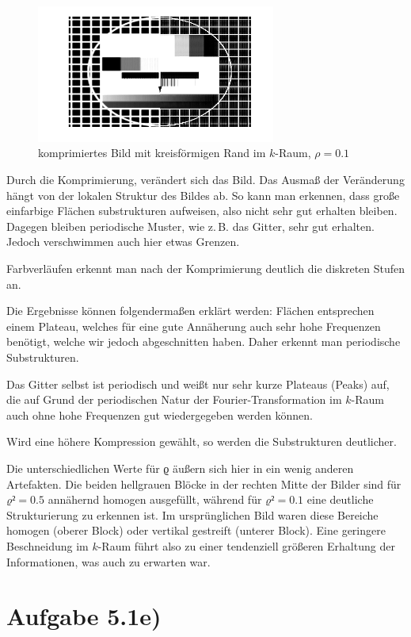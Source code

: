 \begin{figure}[htb]
\centering
  \includegraphics[width=0.7\textwidth,keepaspectratio]{../tmp/eins_c_0_1}
  \caption{komprimiertes Bild mit kreisförmigen Rand im $k$-Raum, $ρ=0.1$}
  \label{fig:1d1}
\end{figure}

Durch die Komprimierung, verändert sich das Bild. Das Ausmaß der Veränderung
hängt von der lokalen Struktur des Bildes ab. So kann man erkennen, dass
große einfarbige Flächen substrukturen aufweisen, also nicht sehr gut erhalten
bleiben. Dagegen bleiben periodische Muster, wie z.\,B. das Gitter, sehr gut
erhalten. Jedoch verschwimmen auch hier etwas Grenzen.

Farbverläufen erkennt man nach der Komprimierung deutlich die diskreten Stufen an.

Die Ergebnisse können folgendermaßen erklärt werden: Flächen entsprechen einem Plateau,
welches für eine gute Annäherung auch sehr hohe Frequenzen benötigt, welche wir jedoch
abgeschnitten haben. Daher erkennt man periodische Substrukturen.

Das Gitter selbst ist periodisch und weißt nur sehr kurze Plateaus (Peaks) auf, die auf Grund
der periodischen Natur der Fourier-Transformation im $k$-Raum auch ohne hohe Frequenzen
gut wiedergegeben werden können.

Wird eine höhere Kompression gewählt, so werden die Substrukturen deutlicher.

Die unterschiedlichen Werte für ϱ äußern sich hier in ein wenig anderen Artefakten. 
Die beiden hellgrauen Blöcke in der rechten Mitte der Bilder sind für $ϱ²=0.5$
annähernd homogen ausgefüllt, während für $ϱ²=0.1$ eine deutliche Strukturierung
zu erkennen ist. Im ursprünglichen Bild waren diese Bereiche homogen (oberer Block)
oder vertikal gestreift (unterer Block). Eine geringere Beschneidung im $k$-Raum
führt also zu einer tendenziell größeren Erhaltung der Informationen, was auch zu
erwarten war.

\section*{Aufgabe 5.1e)}
